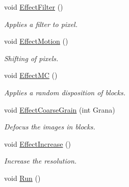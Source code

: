 \begin{DoxyCompactItemize}
\item 
void \hyperlink{classDrEffect_a62e60652a984dcd65b592fde6e89ddbc}{Effect\+Filter} ()\hypertarget{classDrEffect_a62e60652a984dcd65b592fde6e89ddbc}{}\label{classDrEffect_a62e60652a984dcd65b592fde6e89ddbc}

\begin{DoxyCompactList}\small\item\em Applies a filter to pixel. \end{DoxyCompactList}\item 
void \hyperlink{classDrEffect_a3106c4097c47a929b15fb0bf788b161d}{Effect\+Motion} ()\hypertarget{classDrEffect_a3106c4097c47a929b15fb0bf788b161d}{}\label{classDrEffect_a3106c4097c47a929b15fb0bf788b161d}

\begin{DoxyCompactList}\small\item\em Shifting of pixels. \end{DoxyCompactList}\item 
void \hyperlink{classDrEffect_ae52c5b89d732c8cd4c027c2e6d82be39}{Effect\+MC} ()\hypertarget{classDrEffect_ae52c5b89d732c8cd4c027c2e6d82be39}{}\label{classDrEffect_ae52c5b89d732c8cd4c027c2e6d82be39}

\begin{DoxyCompactList}\small\item\em Applies a random disposition of blocks. \end{DoxyCompactList}\item 
void \hyperlink{classDrEffect_aab090cce7962df824dd04060dc002bc2}{Effect\+Coarse\+Grain} (int Grana)\hypertarget{classDrEffect_aab090cce7962df824dd04060dc002bc2}{}\label{classDrEffect_aab090cce7962df824dd04060dc002bc2}

\begin{DoxyCompactList}\small\item\em Defocus the images in blocks. \end{DoxyCompactList}\item 
void \hyperlink{classDrEffect_aadc5a450e9bf79186f43915f10886c0d}{Effect\+Increase} ()\hypertarget{classDrEffect_aadc5a450e9bf79186f43915f10886c0d}{}\label{classDrEffect_aadc5a450e9bf79186f43915f10886c0d}

\begin{DoxyCompactList}\small\item\em Increase the resolution. \end{DoxyCompactList}\item 
void \hyperlink{classDrEffect_aa3eca255b6be227d7d901cc2a72017a5}{Run} ()\hypertarget{classDrEffect_aa3eca255b6be227d7d901cc2a72017a5}{}\label{classDrEffect_aa3eca255b6be227d7d901cc2a72017a5}


\end{DoxyCompactItemize}
